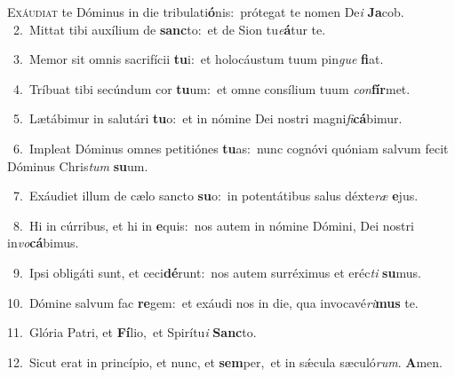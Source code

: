 \lettrine{\initial\textcolor{\initialcolor}{E}}{xáudiat} te Dóminus in die tribulati\-\textbf{ó}\-nis:~\star prótegat te nomen De\textit{i} \textbf{Ja}\-cob.\\
{\numbfont\textcolor{\numbcolor}{~2.}}~Mittat tibi auxílium de \textbf{sanc}\-to:~\star et de Sion tu\-\textit{e}\-\textbf{á}tur te.\par
{\numbfont\textcolor{\numbcolor}{~3.}}~Memor sit omnis sacrifícii \textbf{tu}\-i:~\star et holocáustum tuum pin\textit{gue} \textbf{fi}\-at.\par
{\numbfont\textcolor{\numbcolor}{~4.}}~Tríbuat tibi secúndum cor \textbf{tu}\-um:~\star et omne consílium tuum \textit{con}\-\textbf{fír}met.\par
{\numbfont\textcolor{\numbcolor}{~5.}}~Lætábimur in salutári \textbf{tu}\-o:~\star et in nómine Dei nostri magni\-\textit{fi}\-\textbf{cá}bimur.\par
{\numbfont\textcolor{\numbcolor}{~6.}}~Impleat Dóminus omnes petitiónes \textbf{tu}\-as:~\star nunc cognóvi quóniam salvum fecit Dóminus Chris\textit{tum} \textbf{su}\-um.\par
{\numbfont\textcolor{\numbcolor}{~7.}}~Exáudiet illum de cælo sancto \textbf{su}\-o:~\star in potentátibus salus déxte\textit{ræ} \textbf{e}\-jus.\par
{\numbfont\textcolor{\numbcolor}{~8.}}~Hi in cúrribus, et hi in \textbf{e}\-quis:~\star nos autem in nómine Dómini, Dei nostri in\-\textit{vo}\-\textbf{cá}bimus.\par
{\numbfont\textcolor{\numbcolor}{~9.}}~Ipsi obligáti sunt, et ceci\-\textbf{dé}\-runt:~\star nos autem surréximus et eréc\textit{ti} \textbf{su}\-mus.\par
{\numbfont\textcolor{\numbcolor}{10.}}~Dómine salvum fac \textbf{re}\-gem:~\star et exáudi nos in die, qua invocavé\-\textit{ri}\-\textbf{mus} te.\par
{\numbfont\textcolor{\numbcolor}{11.}}~Glória Patri, et \textbf{Fí}\-lio,~\star et Spirítu\textit{i} \textbf{Sanc}\-to.\par
{\numbfont\textcolor{\numbcolor}{12.}}~Sicut erat in princípio, et nunc, et \textbf{sem}\-per,~\star et in sǽcula sæculó\-\textit{rum}\-. \textbf{A}\-men.\par
